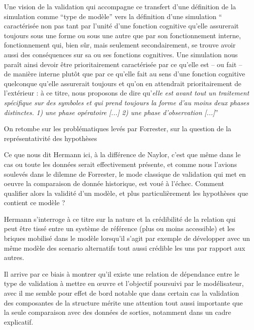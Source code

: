 Une vision de la validation qui accompagne ce transfert d'une définition de la simulation comme \enquote{type de modèle} vers la définition d'une simulation \enquote{ caractérisée non pas tant par l’unité d’une fonction cognitive qu’elle assurerait toujours sous une forme ou sous une autre que par son fonctionnement interne, fonctionnement qui, bien sûr, mais seulement secondairement, se trouve avoir aussi des conséquences sur sa ou ses fonctions cognitives. Une simulation nous paraît ainsi devoir être prioritairement caractérisée par ce qu’elle est – ou fait – de manière interne plutôt que par ce qu’elle fait au sens d’une fonction cognitive quelconque qu’elle assurerait toujours et qu’on en attendrait prioritairement de l’extérieur : à ce titre, nous proposons de dire qu’\textit{elle est avant tout un traitement spécifique sur des symboles et qui prend toujours la forme d'au moins deux phases distinctes. 1) une phase opératoire [...] 2) une phase d'observation [...]}} \autocite[33-34]{Varenne2013}

On retombe sur les problématiques levés par Forrester, sur la question de la représentativité des hypothèses

Ce que nous dit Hermann ici, à la différence de Naylor, c'est que même dans le cas ou toute les données serait effectivement présente, et comme nous l'avions soulevés dans le dilemne de Forrester, le mode classique de validation qui met en oeuvre la comparaison de donnée historique, est voué à l'échec. Comment qualifier alors la validité d'un modèle, et plus particulièrement les hypothèses que contient ce modèle ?

Hermann s'interroge à ce titre sur la nature et la crédibilité de la relation qui peut être tissé entre un système de référence (plus ou moins accessible) et les briques mobilisé dans le modèle lorsqu'il s'agit par exemple de développer avec un même modèle des scenario alternatifs tout aussi crédible les uns par rapport aux autres.

Il arrive par ce biais à montrer qu'il existe une relation de dépendance entre le type de validation à mettre en œuvre et l'objectif poursuivi par le modélisateur, avec il me semble pour effet de bord notable que dans certain cas la validation des composantes de la structure mérite une attention tout aussi importante que la seule comparaison avec des données de sorties, notamment dans un cadre explicatif.

